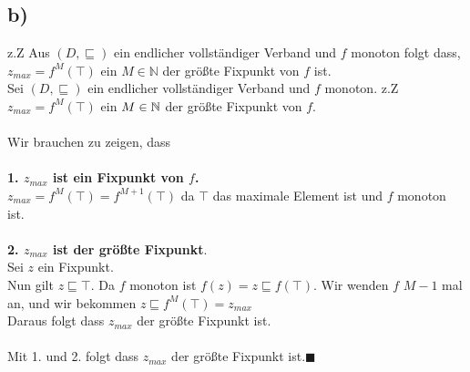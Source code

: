 \subsection*{b)}
z.Z Aus $(D,\sqsubseteq)$ ein endlicher vollständiger Verband und $f$ monoton folgt dass, $z_{max} = f^M(\top)$ ein $M \in \mathbb{N}$ der größte Fixpunkt von $f$ ist.\\
Sei $(D,\sqsubseteq)$ ein endlicher vollständiger Verband und $f$ monoton.
z.Z $z_{max} = f^M(\top)$ ein $M \in \mathbb{N}$ der größte Fixpunkt von $f$.\\\\
Wir brauchen zu zeigen, dass\\\\
\textbf{1. $z_{max}$ ist ein Fixpunkt von $f$.}\\
$z_{max} = f^M(\top) = f^{M+1}(\top)$ da $\top$ das maximale Element ist und $f$ monoton ist.\\\\
\textbf{2. $z_{max}$ ist der größte Fixpunkt}.\\
Sei $z$ ein Fixpunkt.\\
Nun gilt $z \sqsubseteq \top$. Da $f$ monoton ist
$f(z) = z  \sqsubseteq f(\top)$. Wir wenden $f$ $M-1$ mal an, und wir bekommen $z  \sqsubseteq f^M(\top) = z_{max} $\\
Daraus folgt dass $ z_{max}$ der größte Fixpunkt ist.\\\\
Mit 1. und 2. folgt dass $z_{max}$ der größte Fixpunkt ist.$\blacksquare$





